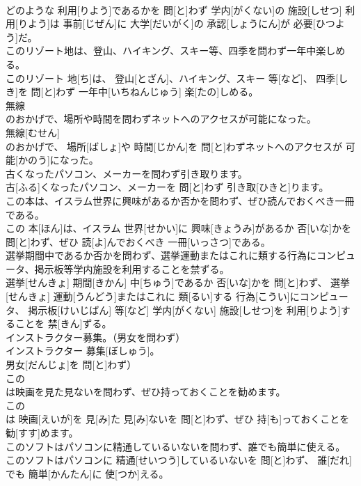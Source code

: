 \documentclass[8pt]{extreport}
\begin{document}
\begin{CJK}{UTF8}{min}
\\	どのような 利用[りよう]であるかを 問[と]わず 学内[がくない]の 施設[しせつ] 利用[りよう]は 事前[じぜん]に 大学[だいがく]の 承認[しょうにん]が 必要[ひつよう]だ。
\\	このリゾート地は、登山、ハイキング、スキー等、四季を問わず一年中楽しめる。	
\\	このリゾート 地[ち]は、 登山[とざん]、ハイキング、スキー 等[など]、 四季[しき]を 問[と]わず 一年中[いちねんじゅう] 楽[たの]しめる。
\\	無線
\\	のおかげで、場所や時間を問わずネットへのアクセスが可能になった。	
\\	無線[むせん] 
\\	[らん] のおかげで、 場所[ばしょ]や 時間[じかん]を 問[と]わずネットへのアクセスが 可能[かのう]になった。
\\	古くなったパソコン、メーカーを問わず引き取ります。	
\\	古[ふる]くなったパソコン、メーカーを 問[と]わず 引き取[ひきと]ります。
\\	この本は、イスラム世界に興味があるか否かを問わず、ぜひ読んでおくべき一冊である。	
\\	この 本[ほん]は、イスラム 世界[せかい]に 興味[きょうみ]があるか 否[いな]かを 問[と]わず、ぜひ 読[よ]んでおくべき 一冊[いっさつ]である。
\\	選挙期間中であるか否かを問わず、選挙運動またはこれに類する行為にコンピュータ、掲示板等学内施設を利用することを禁ずる。	
\\	選挙[せんきょ] 期間[きかん] 中[ちゅう]であるか 否[いな]かを 問[と]わず、 選挙[せんきょ] 運動[うんどう]またはこれに 類[るい]する 行為[こうい]にコンピュータ、 掲示板[けいじばん] 等[など] 学内[がくない] 施設[しせつ]を 利用[りよう]することを 禁[きん]ずる。
\\	インストラクター募集。（男女を問わず）	
\\	インストラクター 募集[ぼしゅう]。
\\	男女[だんじょ]を 問[と]わず）
\\	この
\\	は映画を見た見ないを問わず、ぜひ持っておくことを勧めます。	
\\	この 
\\	は 映画[えいが]を 見[み]た 見[み]ないを 問[と]わず、ぜひ 持[も]っておくことを 勧[すす]めます。
\\	このソフトはパソコンに精通しているいないを問わず、誰でも簡単に使える。	
\\	このソフトはパソコンに 精通[せいつう]しているいないを 問[と]わず、 誰[だれ]でも 簡単[かんたん]に 使[つか]える。

\end{CJK}
\end{document}

